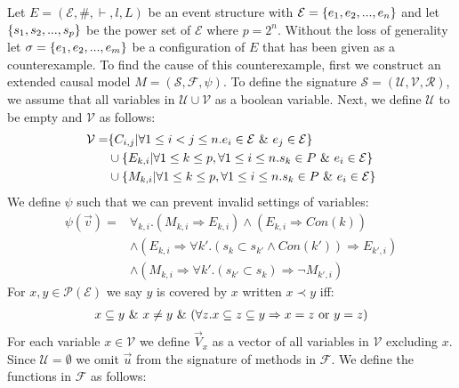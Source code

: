 
Let $E = (\mathcal{E},\#,\vdash,l,L)$ be an event structure with
$\mathcal{E} = \{e_1, e_2, ...,e_n\}$ and let $\{s_1,s_2,...,s_p\}$ be the power set of $\mathcal{E}$ where $p = 2^n$.
Without the loss of generality let $\sigma = \{e_1,e_2,...,e_m\}$ be a configuration of $E$ that
has been given as a counterexample.
To find the cause of this counterexample, first we construct an extended causal model $M = (\mathcal{S},\mathcal{F},\psi)$.
To define the signature $\mathcal{S} = (\mathcal{U},\mathcal{V},\mathcal{R})$, we assume that all variables in $\mathcal{U} \cup \mathcal{V}$ as a boolean variable.
Next, we define $\mathcal{U}$ to be empty and $\mathcal{V}$ as follows:
\begin{align*}
    \mathcal{V} = & \{C_{i,j} | \forall 1 \leq i < j \leq n. e_i \in \mathcal{E} \ \& \  e_j \in \mathcal{E}\}                    \\
                  & \cup \{E_{k,i} | \forall 1 \leq k \leq p , \forall 1 \leq i \leq n . s_k \in P \ \& \  e_i \in \mathcal{E} \} \\
                  & \cup \{M_{k,i} | \forall 1 \leq k \leq p , \forall 1 \leq i \leq n . s_k \in P \ \& \  e_i \in \mathcal{E} \} \\
\end{align*}
We define $\psi$ such that we can prevent invalid settings of variables:
\begin{align*}
    \psi(\vec v) = & \forall_{k,i}.
    \left(
    M_{k,i} \Rightarrow E_{k,i}
    \right)
    \wedge
    \left(
    E_{k,i} \Rightarrow Con(k)
    \right)
    \\
                   & \wedge \left(E_{k,i} \Rightarrow
    \forall k'. (s_k \subset s_{k'} \wedge Con(k')) \Rightarrow E_{k',i}
    \right)                                           \\
                   & \wedge \left(
    M_{k,i} \Rightarrow \forall k'.
    (s_{k'} \subset s_k) \Rightarrow \neg M_{k',i}
    \right)
\end{align*}
For $x,y \in \mathcal{P}(\mathcal{E})$ we say $y$ is covered by $x$ written $ x \prec y$ iff:
\begin{align*}
    x \subseteq y \ \& \  x \neq y \ \& \ 
    (\forall z. x \subseteq z \subseteq y \Rightarrow x = z
    \text{ or } y = z)
\end{align*}
For each variable $x \in \mathcal{V}$ we define $\vec V_x$ as a vector
of all variables in $\mathcal{V}$ excluding $x$.
Since $\mathcal{U} = \emptyset$ we omit $\vec u$ from the
signature of methods in $\mathcal{F}$.
We define the functions in $\mathcal{F}$ as follows:
